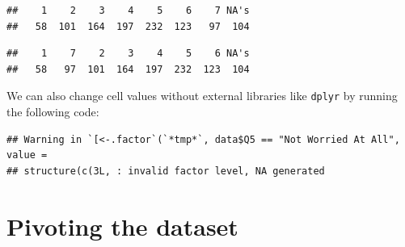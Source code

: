 \documentclass[
]{book}
\newenvironment{Shaded}{\begin{snugshade}}{\end{snugshade}}
\newcommand{\CommentTok}[1]{\textcolor[rgb]{0.56,0.35,0.01}{\textit{#1}}}
\newcommand{\DataTypeTok}[1]{\textcolor[rgb]{0.13,0.29,0.53}{#1}}
\newcommand{\DecValTok}[1]{\textcolor[rgb]{0.00,0.00,0.81}{#1}}
\newcommand{\KeywordTok}[1]{\textcolor[rgb]{0.13,0.29,0.53}{\textbf{#1}}}
\newcommand{\NormalTok}[1]{#1}
\newcommand{\OperatorTok}[1]{\textcolor[rgb]{0.81,0.36,0.00}{\textbf{#1}}}
\newcommand{\StringTok}[1]{\textcolor[rgb]{0.31,0.60,0.02}{#1}}
\begin{document}
\begin{verbatim}
##    1    2    3    4    5    6    7 NA's 
##   58  101  164  197  232  123   97  104
\end{verbatim}

\begin{Shaded}
\end{Shaded}

\begin{verbatim}
##    1    7    2    3    4    5    6 NA's 
##   58   97  101  164  197  232  123  104
\end{verbatim}

We can also change cell values without external libraries like \texttt{dplyr} by running the following code:

\begin{Shaded}
\end{Shaded}

\begin{verbatim}
## Warning in `[<-.factor`(`*tmp*`, data$Q5 == "Not Worried At All", value =
## structure(c(3L, : invalid factor level, NA generated
\end{verbatim}

\hypertarget{pivoting-the-dataset}{%
\section{Pivoting the dataset}\label{pivoting-the-dataset}}
\end{document}
